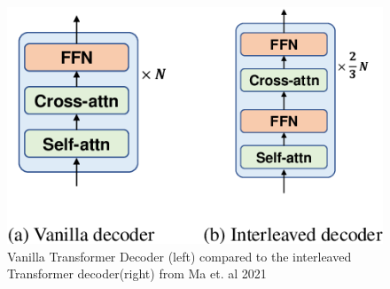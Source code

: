 \begin{figure}
    \centering
    \includegraphics[width=0.5\linewidth]{Latex/sections/images/interleaveddecoder.png}
    \caption{Vanilla Transformer Decoder (left) compared to the interleaved Transformer decoder(right) from Ma et. al 2021}
    \label{fig:interleaved decoder}
\end{figure}